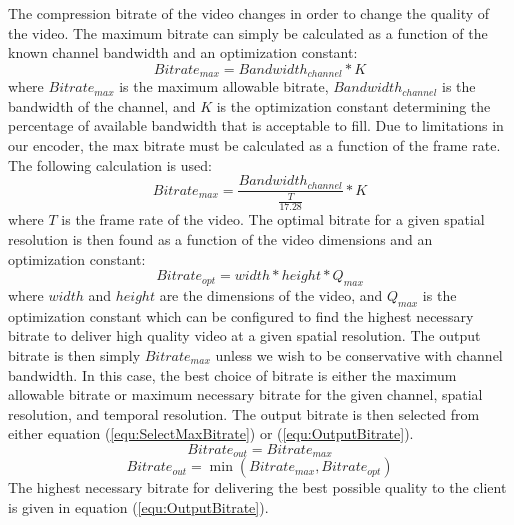 The compression bitrate of the video changes in order to change the quality of the video. The maximum bitrate can simply be calculated as a function of the known channel bandwidth and an optimization constant:
\begin{equation}
\label{equ:BitrateCalculation}
Bitrate_{max} = Bandwidth_{channel} * K
\end{equation}
where $Bitrate_{max}$  is the maximum allowable bitrate, $Bandwidth_{channel}$ is the bandwidth of the channel, and $K$ is the optimization constant determining the percentage of available bandwidth that is acceptable to fill. Due to limitations in our encoder, the max bitrate must be calculated as a function of the frame rate. The following calculation is used: 
\begin{equation}
\label{equ:LimitedBitrateCalculation}
Bitrate_{max} = \frac {Bandwidth_{channel}}{\frac {T} {17.28} } * K
\end{equation}
where $T$ is the frame rate of the video. The optimal bitrate for a given spatial resolution is then found as a function of the video dimensions and an optimization constant:
\begin{equation}
\label{equ:OptimalBitrate}
Bitrate_{opt} = width * height * Q_{max}
\end{equation}
where $width$ and $height$ are the dimensions of the video, and $Q_{max}$ is the optimization constant which can be configured to find the highest necessary bitrate to deliver high quality video at a given spatial resolution. The output bitrate is then simply $Bitrate_{max}$ unless we wish to be conservative with channel bandwidth. In this case, the best choice of bitrate is either the maximum allowable bitrate or maximum necessary bitrate for the given channel, spatial resolution, and temporal resolution. The output bitrate is then selected from either equation (\ref{equ:SelectMaxBitrate}) or (\ref{equ:OutputBitrate}).
\begin{equation}
\label{equ:SelectMaxBitrate}
Bitrate_{out} = Bitrate_{max}
\end{equation}
\begin{equation}
\label{equ:OutputBitrate}
Bitrate_{out} = \min (Bitrate_{max} , Bitrate_{opt})
\end{equation}
The highest necessary bitrate for delivering the best possible quality to the client is given in equation (\ref{equ:OutputBitrate}).

